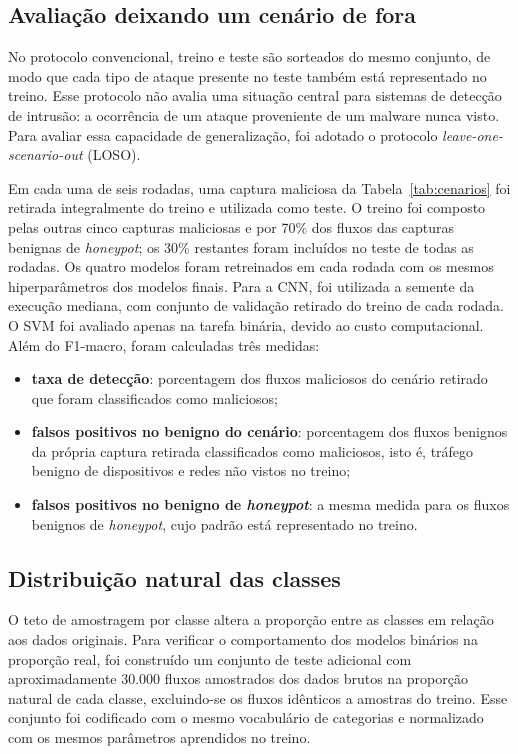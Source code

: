 \subsection{Avaliação deixando um cenário de fora}
\label{sec:loso}

No protocolo convencional, treino e teste são sorteados do mesmo conjunto, de modo que cada tipo de ataque presente no teste também está representado no treino. Esse protocolo não avalia uma situação central para sistemas de detecção de intrusão: a ocorrência de um ataque proveniente de um malware nunca visto. Para avaliar essa capacidade de generalização, foi adotado o protocolo \textit{leave-one-scenario-out} (LOSO).

Em cada uma de seis rodadas, uma captura maliciosa da Tabela~\ref{tab:cenarios} foi retirada integralmente do treino e utilizada como teste. O treino foi composto pelas outras cinco capturas maliciosas e por 70\% dos fluxos das capturas benignas de \textit{honeypot}; os 30\% restantes foram incluídos no teste de todas as rodadas. Os quatro modelos foram retreinados em cada rodada com os mesmos hiperparâmetros dos modelos finais. Para a CNN, foi utilizada a semente da execução mediana, com conjunto de validação retirado do treino de cada rodada. O SVM foi avaliado apenas na tarefa binária, devido ao custo computacional. Além do F1-macro, foram calculadas três medidas:
\begin{itemize}
    \item \textbf{taxa de detecção}: porcentagem dos fluxos maliciosos do cenário retirado que foram classificados como maliciosos;
    \item \textbf{falsos positivos no benigno do cenário}: porcentagem dos fluxos benignos da própria captura retirada classificados como maliciosos, isto é, tráfego benigno de dispositivos e redes não vistos no treino;
    \item \textbf{falsos positivos no benigno de \textit{honeypot}}: a mesma medida para os fluxos benignos de \textit{honeypot}, cujo padrão está representado no treino.
\end{itemize}

\subsection{Distribuição natural das classes}

O teto de amostragem por classe altera a proporção entre as classes em relação aos dados originais. Para verificar o comportamento dos modelos binários na proporção real, foi construído um conjunto de teste adicional com aproximadamente 30.000 fluxos amostrados dos dados brutos na proporção natural de cada classe, excluindo-se os fluxos idênticos a amostras do treino. Esse conjunto foi codificado com o mesmo vocabulário de categorias e normalizado com os mesmos parâmetros aprendidos no treino.

